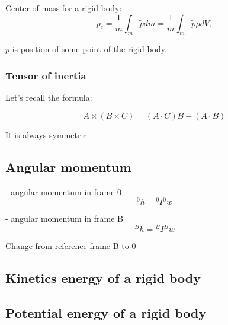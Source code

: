 Center of mass for a rigid body:
\[p_c = \dfrac{1}{m} \int_m { \widetilde{p}  dm} = \dfrac{1}{m} \int_m {\widetilde{p} \rho dV}, \]

$\widetilde{p}$ is position of some point of the rigid body.

\subsubsection{Tensor of inertia}

Let's recall the formula:

\[A \times (B \times C) = (A \cdot C)B - (A \cdot B)\]

It is always symmetric.




\subsection{Angular momentum}

- angular momentum in frame {0}
\[{}^0h = {}^0I  {}^0w\]

- angular momentum in frame {B}
\[{}^Bh = {}^BI  {}^Bw\]

Change from reference frame {B} to {0}


\subsection{Kinetics energy of a rigid body}
\subsection{Potential energy of a rigid body}